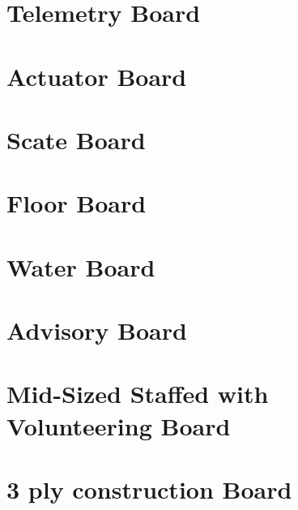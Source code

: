 \documentclass[12pt,article]{memoir}
\begin{document}
\newpage
\chapter{Telemetry Board}
\chapter{Actuator Board}
\chapter{Scate Board}
\chapter{Floor Board}
\chapter{Water Board}
\chapter{Advisory  Board}
\chapter{Mid-Sized Staffed with Volunteering Board}
\chapter{3 ply construction Board}

\end{document}
